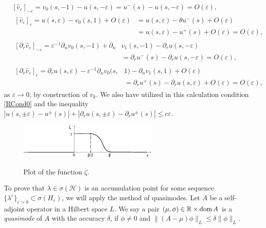 \documentclass[reqno]{amsart}
\theoremstyle{plain}
\numberwithin{equation}{section}
\newcommand{\dom}{\mathop{\rm dom}}
\newcommand{\Real}{\mathbb R}
\newcommand{\eps}{\varepsilon}
\newcommand{\cH}{\mathcal{H}}
\renewcommand{\leq}{\leqslant}
\begin{document}
 \begin{align*}{}
  &[\hat{v}_\eps]_{-\eps}=v_0(s,-1)-u(s,-\eps)
                  =u^-(s)-u(s,-\eps)=O(\eps),
  \\
  &\begin{aligned}{}
  [\hat{v}_\eps]_{\eps}=u(s,\eps)-v_0(s,1)+O(\eps)
                  &=u(s,\eps)-\theta u^-(s)+O(\eps)\\
                  &=u(s,\eps)-u^+(s)+O(\eps)=O(\eps),
   \end{aligned}
   \\
   &\begin{aligned}{}
  [\partial_r\hat{v}_\eps]_{-\eps}=\eps^{-1}\partial_n v_0(s,-1)+\partial_n &v_1(s,-1)-\partial_r u(s,-\eps)
                  \\
  &=\partial_r u^-(s)-\partial_r u(s,-\eps)=O(\eps),
   \end{aligned}
   \\
    &\begin{aligned}{}
  [\partial_r\hat{v}_\eps]_{\eps}=\partial_r u(s,\eps)-\eps^{-1}\partial_n v_0(s,&1)-\partial_nv_1(s,1)+O(\eps)
                  \\
  &=\partial_r u^+(s)-\partial_r u(s,\eps)+O(\eps)=O(\eps),
   \end{aligned}
 \end{align*}
as $\eps\to 0$, by construction of $v_k$. We also have utilized in this calculation condition \eqref{RCond0} and the  inequality
$|u(s,\pm \eps)-u^\pm(s)|+|\partial_ru(s,\pm \eps)
-\partial_r u^\pm(s)|\leq c\eps$.





\begin{figure}[t]
  \centering
  \includegraphics[scale=1.8]{JumpFunction}\\
  \caption{Plot of the function $\zeta$.}\label{FigPlotZeta}
\end{figure}





To prove that $\lambda\in \sigma(\cH)$ is an accumulation point for some sequence $\{\lambda^\eps\}_{\eps>0}\subset \sigma(H_\eps)$, we will apply the method of quasimodes.
Let $A$ be a self-adjoint operator in a Hilbert space $L$.
We say a pair $(\mu, \phi)\in \Real\times \dom A$ is a \textit{quasimode} of  $A$ with the accuracy $\delta$, if $\phi\neq 0$  and
$\|(A-\mu)\phi\|_L\leq\delta\|\phi\|_L$.
\end{document}
